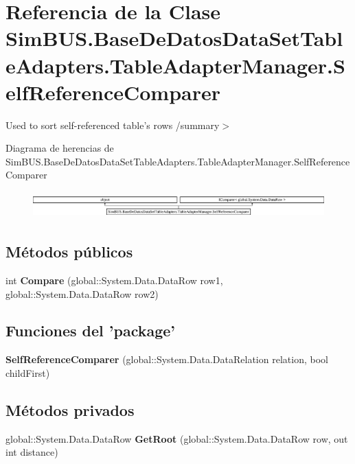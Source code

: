 \section{Referencia de la Clase Sim\-B\-U\-S.\-Base\-De\-Datos\-Data\-Set\-Table\-Adapters.\-Table\-Adapter\-Manager.\-Self\-Reference\-Comparer}
\label{class_sim_b_u_s_1_1_base_de_datos_data_set_table_adapters_1_1_table_adapter_manager_1_1_self_reference_comparer}


Used to sort self-\/referenced table's rows /summary$>$  


Diagrama de herencias de Sim\-B\-U\-S.\-Base\-De\-Datos\-Data\-Set\-Table\-Adapters.\-Table\-Adapter\-Manager.\-Self\-Reference\-Comparer\begin{figure}[H]
\begin{center}
\leavevmode
\includegraphics[height=1.033210cm]{class_sim_b_u_s_1_1_base_de_datos_data_set_table_adapters_1_1_table_adapter_manager_1_1_self_reference_comparer}
\end{center}
\end{figure}
\subsection*{Métodos públicos}
\begin{DoxyCompactItemize}
\item 
int {\bf Compare} (global\-::\-System.\-Data.\-Data\-Row row1, global\-::\-System.\-Data.\-Data\-Row row2)
\end{DoxyCompactItemize}
\subsection*{Funciones del 'package'}
\begin{DoxyCompactItemize}
\item 
{\bf Self\-Reference\-Comparer} (global\-::\-System.\-Data.\-Data\-Relation relation, bool child\-First)
\end{DoxyCompactItemize}
\subsection*{Métodos privados}
\begin{DoxyCompactItemize}
\item 
global\-::\-System.\-Data.\-Data\-Row {\bf Get\-Root} (global\-::\-System.\-Data.\-Data\-Row row, out int distance)
\end{DoxyCompactItemize}
